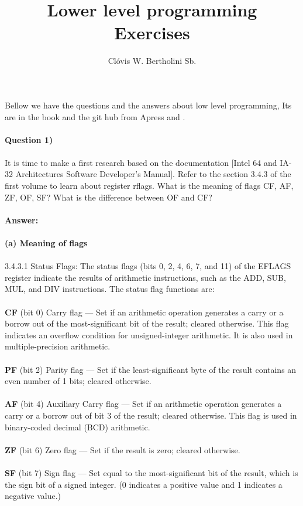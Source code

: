 \documentclass[11pt, a4paper]{amsart}
\title{Lower level programming\\Exercises}
\author{Clóvis W. Bertholini Sb.}
\numberwithin{equation}{section}
\theoremstyle{plain} %
\theoremstyle{definition}
\theoremstyle{remark}
\begin{document}
\maketitle
Bellow we have the questions and the answers about low level programming, Its are in the book and the git hub from Apress \cite{zhirkov} and \cite{gitzhirkov}.\\
\\
\textbf{Question 1)}\\
\\
It is time to make a first research based on the documentation [Intel 64 and IA-32 Architectures Software Developer's Manual]. Refer to the section 3.4.3 of the first volume to learn about register rflags. What is the meaning of flags CF, AF, ZF, OF, SF? What is the difference between OF and CF?\\
\\
\textbf{Answer:}\\
\\
\textbf{(a) Meaning of flags}\\
\\
3.4.3.1  Status Flags: The status flags (bits 0, 2, 4, 6, 7, and 11) of the EFLAGS register indicate the results of arithmetic instructions, such as the ADD, SUB, MUL, and DIV instructions. The status flag functions are:\\
\\
\textbf{CF} (bit 0) Carry flag — Set if an arithmetic operation generates a carry or a borrow out of the most-significant bit of the result; cleared otherwise. This flag indicates an overflow condition for unsigned-integer arithmetic. It is also used in multiple-precision arithmetic.\\
\\
\textbf{PF} (bit 2) Parity flag — Set if the least-significant byte of the result contains an even number of 1 bits; cleared otherwise.\\
\\
\textbf{AF} (bit 4) Auxiliary Carry flag — Set if an arithmetic operation generates a carry or a borrow out of bit 3 of the result; cleared otherwise. This flag is used in binary-coded decimal (BCD) arithmetic.\\
\\
\textbf{ZF} (bit 6) Zero flag — Set if the result is zero; cleared otherwise.\\
\\
\textbf{SF} (bit 7) Sign flag — Set equal to the most-significant bit of the result, which is the sign bit of a signed integer. (0 indicates a positive value and 1 indicates a negative value.)\\
\end{document}
